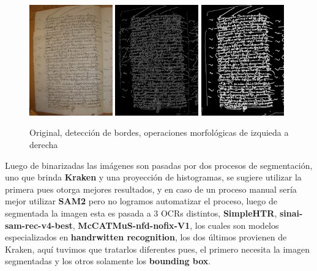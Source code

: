 \documentclass[11pt,a4paper]{article}
\begin{document}
\begin{figure}[h] \centering \begin{minipage}{1.0\textwidth} \includegraphics[width=0.32\textwidth]{CODEA-0205_2v.jpg} \includegraphics[width=0.32\textwidth]{canny_image_aftergauss_eq2.png} \includegraphics[width=0.32\textwidth]{photo_2025-01-27_21-34-01.jpg} \caption{Original, detecci\'on de bordes, operaciones morfol\'ogicas de izquieda a derecha} \label{fig:tresfotos} \end{minipage} \end{figure}
Luego de binarizadas las im\'agenes son pasadas por dos procesos de segmentación, uno que brinda \textbf{Kraken} y una proyecci\'on de histogramas, se sugiere utilizar la primera pues otorga mejores resultados, y en caso de un proceso manual ser\'ia mejor utilizar \textbf{SAM2} pero no logramos automatizar el proceso, luego de segmentada la imagen esta es pasada a 3 OCRs distintos, \textbf{SimpleHTR}, \textbf{sinai-sam-rec-v4-best}, \textbf{McCATMuS-nfd-nofix-V1}, los cuales son modelos especializados en \textbf{handrwitten recognition}, los dos \'ultimos provienen de Kraken, aqu\'i tuvimos que tratarlos diferentes pues, el primero necesita la imagen segmentadas y los otros solamente los \textbf{bounding box}.
\end{document}
